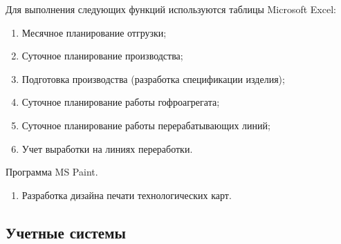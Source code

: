 Для выполнения следующих функций используются таблицы Microsoft Excel:
\begin{enumerate}
\item Месячное планирование отгрузки;
\item Суточное планирование производства;
\item Подготовка производства (разработка спецификации изделия);
\item Суточное планирование работы гофроагрегата;
 \item Суточное планирование работы перерабатывающих линий;
\item Учет выработки на линиях переработки.
\end{enumerate}


Программа MS Paint.
\begin{enumerate}
\item Разработка дизайна печати технологических карт.
\end{enumerate}



\subsection{Учетные системы}

